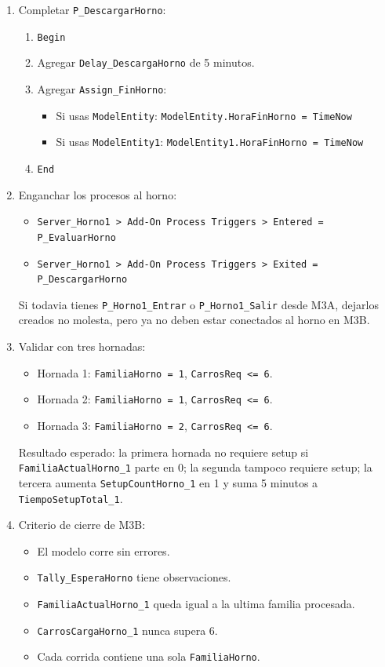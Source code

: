 \documentclass[11pt]{article}
\newcommand{\simio}[1]{\texttt{#1}}
\newcommand{\state}[1]{\texttt{#1}}
\newcommand{\proc}[1]{\texttt{#1}}
\begin{document}
\begin{enumerate}
  \item Completar \proc{P\_DescargarHorno}:
  \begin{enumerate}
    \item \simio{Begin}
    \item Agregar \simio{Delay\_DescargaHorno} de 5 minutos.
    \item Agregar \simio{Assign\_FinHorno}:
    \begin{itemize}
      \item Si usas \simio{ModelEntity}: \state{ModelEntity.HoraFinHorno = TimeNow}
      \item Si usas \simio{ModelEntity1}: \state{ModelEntity1.HoraFinHorno = TimeNow}
    \end{itemize}
    \item \simio{End}
  \end{enumerate}

  \item Enganchar los procesos al horno:
  \begin{itemize}
    \item \simio{Server\_Horno1 > Add-On Process Triggers > Entered = P\_EvaluarHorno}
    \item \simio{Server\_Horno1 > Add-On Process Triggers > Exited = P\_DescargarHorno}
  \end{itemize}
  Si todavia tienes \proc{P\_Horno1\_Entrar} o \proc{P\_Horno1\_Salir} desde M3A, dejarlos creados no molesta, pero ya no deben estar conectados al horno en M3B.

  \item Validar con tres hornadas:
  \begin{itemize}
    \item Hornada 1: \state{FamiliaHorno = 1}, \state{CarrosReq <= 6}.
    \item Hornada 2: \state{FamiliaHorno = 1}, \state{CarrosReq <= 6}.
    \item Hornada 3: \state{FamiliaHorno = 2}, \state{CarrosReq <= 6}.
  \end{itemize}
  Resultado esperado: la primera hornada no requiere setup si \state{FamiliaActualHorno\_1} parte en 0; la segunda tampoco requiere setup; la tercera aumenta \state{SetupCountHorno\_1} en 1 y suma 5 minutos a \state{TiempoSetupTotal\_1}.

  \item Criterio de cierre de M3B:
  \begin{itemize}
    \item El modelo corre sin errores.
    \item \simio{Tally\_EsperaHorno} tiene observaciones.
    \item \state{FamiliaActualHorno\_1} queda igual a la ultima familia procesada.
    \item \state{CarrosCargaHorno\_1} nunca supera 6.
    \item Cada corrida contiene una sola \state{FamiliaHorno}.
  \end{itemize}
\end{enumerate}
\end{document}
